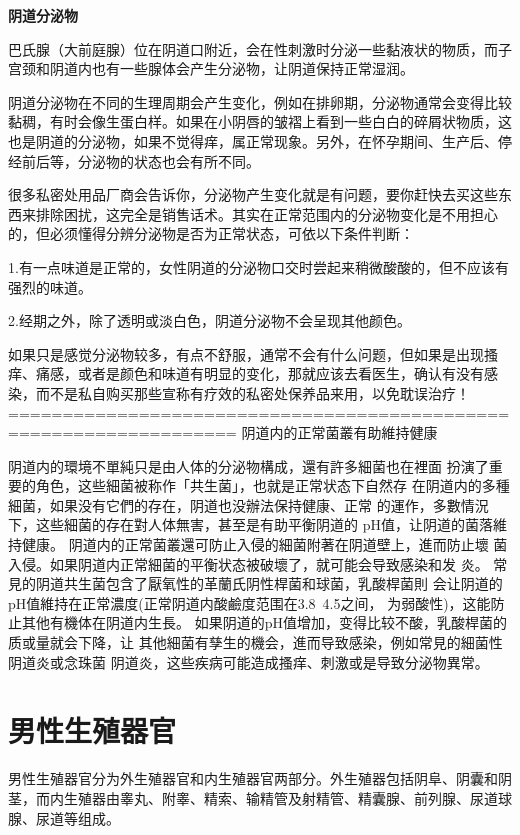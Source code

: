 \documentclass[12pt,UTF8]{ctexbook}
\begin{document}
\textbf{阴道分泌物}

巴氏腺（大前庭腺）位在阴道口附近，会在性刺激时分泌一些黏液状的物质，而子宫颈和阴道内也有一些腺体会产生分泌物，让阴道保持正常湿润。

阴道分泌物在不同的生理周期会产生变化，例如在排卵期，分泌物通常会变得比较黏稠，有时会像生蛋白样。如果在小阴唇的皱褶上看到一些白白的碎屑状物质，这也是阴道的分泌物，如果不觉得痒，属正常现象。另外，在怀孕期间、生产后、停经前后等，分泌物的状态也会有所不同。

很多私密处用品厂商会告诉你，分泌物产生变化就是有问题，要你赶快去买这些东西来排除困扰，这完全是销售话术。其实在正常范围内的分泌物变化是不用担心的，但必须懂得分辨分泌物是否为正常状态，可依以下条件判断：

1.有一点味道是正常的，女性阴道的分泌物口交时尝起来稍微酸酸的，但不应该有强烈的味道。

2.经期之外，除了透明或淡白色，阴道分泌物不会呈现其他颜色。

如果只是感觉分泌物较多，有点不舒服，通常不会有什么问题，但如果是出现搔痒、痛感，或者是颜色和味道有明显的变化，那就应该去看医生，确认有没有感染，而不是私自购买那些宣称有疗效的私密处保养品来用，以免耽误治疗！
===================================================================
阴道内的正常菌叢有助維持健康

阴道内的環境不單純只是由人体的分泌物構成，還有許多細菌也在裡面
扮演了重要的角色，这些細菌被称作「共生菌」，也就是正常状态下自然存
在阴道内的多種細菌，如果没有它們的存在，阴道也没辦法保持健康、正常
的運作，多數情況下，这些細菌的存在對人体無害，甚至是有助平衡阴道的
pH值，让阴道的菌落維持健康。
阴道内的正常菌叢還可防止入侵的細菌附著在阴道壁上，進而防止壞
菌入侵。如果阴道内正常細菌的平衡状态被破壞了，就可能会导致感染和发
炎。
常見的阴道共生菌包含了厭氧性的革蘭氏阴性桿菌和球菌，乳酸桿菌則
会让阴道的pH值維持在正常濃度(正常阴道内酸鹼度范围在3.8~4.5之间，
为弱酸性)，这能防止其他有機体在阴道内生長。
如果阴道的pH值增加，变得比较不酸，乳酸桿菌的质或量就会下降，让
其他細菌有孳生的機会，進而导致感染，例如常見的細菌性阴道炎或念珠菌
阴道炎，这些疾病可能造成搔痒、刺激或是导致分泌物異常。

\chapter{男性生殖器官}

男性生殖器官分为外生殖器官和内生殖器官两部分。外生殖器包括阴阜、阴囊和阴茎，而内生殖器由睾丸、附睾、精索、输精管及射精管、精囊腺、前列腺、尿道球腺、尿道等组成。
\end{document}
